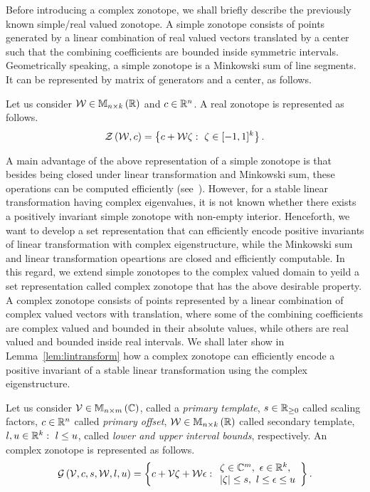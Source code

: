 Before introducing a complex zonotope, we shall briefly describe the
previously known simple/real valued zonotope.  A simple zonotope
consists of points generated by a linear combination of real valued
vectors translated by a center such that the combining coefficients
are bounded inside symmetric intervals.  Geometrically speaking, a
simple zonotope is a Minkowski sum of line segments.  It can be
represented by matrix of generators and a center, as follows.
%
\begin{definition}
Let us consider $\mathcal{W}\in\mathbb{M}_{n\times k}\left(\mathbb{R}\right)$ and $c\in\mathbb{R}^n$.
A real zonotope is represented as follows.
%
\[
\mathit{\mathcal{Z}}\left(\mathcal{W},c\right) = \left\{c+\mathcal{W}\zeta:~\zeta\in[-1,1]^k\right\}.
\]
%
\end{definition}
%
A main advantage of the above representation of a simple zonotope is
that besides being closed under linear transformation and Minkowski
sum, these operations can be computed efficiently (see~\cite{todo}).
However, for a stable linear transformation having complex
eigenvalues, it is not known whether there exists a positively
invariant simple zonotope with non-empty interior.  %
Henceforth, we want to
develop a set representation that can efficiently encode positive
invariants of linear transformation with complex eigenstructure, while
the Minkowski sum and linear transformation opeartions are closed and
efficiently computable.  In this regard, we extend simple
zonotopes to the complex valued domain to yeild a set
representation called complex zonotope that has the above
desirable property.  A complex zonotope consists of points represented
by a linear combination of complex valued vectors with translation,
where some of the combining coefficients are complex valued and
bounded in their absolute values, while others are real valued and
bounded inside real intervals.  We shall later show in Lemma~\ref{lem:lintransform}
how a complex zonotope can efficiently encode a positive invariant of
a stable linear transformation using the complex eigenstructure.
%
\begin{definition}
Let us consider $\mathcal{V}\in\mathbb{M}_{n\times m}\left(\mathbb{C}\right)$, called a
\emph{primary template}, $s\in\mathbb{R}_{\geq 0}$ called scaling
factors, $c\in\mathbb{R}^n$ called \emph{primary offset},
$\mathcal{W}\in\mathbb{M}_{n\times k}\left(\mathbb{R}\right)$ called secondary template,
$l,u\in\mathbb{R}^k:~l\leq u$, called \emph{lower and upper
  interval bounds}, respectively.  An complex zonotope is
represented as follows.
%
\[
\mathcal{G}\left(\mathcal{V},c,s,\mathcal{W},l,u\right) =
\left\{
  c+\mathcal{V}\zeta+\mathcal{W}\epsilon:
  \begin{array}{l}
    \zeta\in\mathbb{C}^m,~\epsilon\in\mathbb{R}^k,\\
    \left|\zeta\right|\leq
    s,~l\leq\epsilon\leq u
   \end{array}
\right\}.
\]
%
\end{definition}
